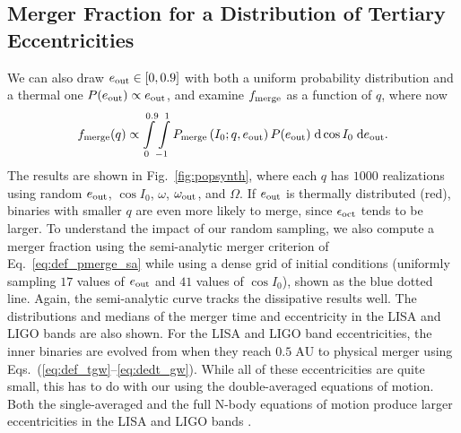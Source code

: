 \documentclass[
        fleqn,
        usenatbib,
    ]{mnras}
\newcommand*{\p}[1]{\left(#1\right)}
\begin{document}
\subsection{Merger Fraction for a Distribution of Tertiary Eccentricities}

We can also draw $e_{\rm out} \in [0, 0.9]$ with both a uniform probability
distribution and a thermal one $P(e_{\rm out}) \propto e_{\rm out}$, and examine
$f_{\rm merge}$ as a function of $q$, where now
\begin{equation}
    f_{\rm merge}(q) \propto
        \int\limits_{0}^{0.9}\int\limits_{-1}^1
            P_{\rm merge}\p{I_0; q, e_{\rm out}} P(e_{\rm out})
            \;\mathrm{d}\cos I_0\;\mathrm{d}e_{\rm out}.
\end{equation}
The results are shown in Fig.~\ref{fig:popsynth}, where each $q$ has $1000$
realizations using random $e_{\rm out}$, $\cos I_0$, $\omega$, $\omega_{\rm
out}$, and $\Omega$. If $e_{\rm out}$ is thermally distributed (red), binaries
with smaller $q$ are even more likely to merge, since $\epsilon_{\rm oct}$ tends
to be larger. To understand the impact of our random sampling, we also compute a
merger fraction using the semi-analytic merger criterion of
Eq.~\eqref{eq:def_pmerge_sa} while using a dense grid of initial conditions
(uniformly sampling $17$ values of $e_{\rm out}$ and $41$ values of $\cos I_0$),
shown as the blue dotted line. Again, the semi-analytic curve tracks the
dissipative results well. The distributions and medians of the merger time and
eccentricity in the LISA and LIGO bands are also shown. For the LISA and LIGO
band eccentricities, the inner binaries are evolved from when they reach
$0.5\;\mathrm{AU}$ to physical merger using
Eqs.~(\ref{eq:def_tgw}--\ref{eq:dedt_gw}). While all of these eccentricities are
quite small, this has to do with our using the double-averaged equations of
motion. Both the single-averaged and the full N-body equations of motion produce
larger eccentricities in the LISA and LIGO bands \citep{LL19}.
\end{document}
